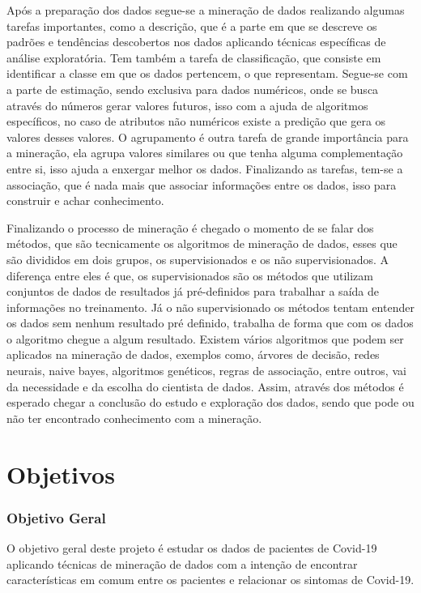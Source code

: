 \documentclass[tcc1]{uftex}
\begin{document}
Após a preparação dos dados segue-se a mineração de dados realizando algumas tarefas importantes, como a descrição, que é a parte em que se descreve os padrões e tendências descobertos nos dados aplicando técnicas específicas de análise exploratória. Tem também a tarefa de classificação, que consiste em identificar a classe em que os dados pertencem, o que representam. Segue-se com a parte de estimação, sendo exclusiva para dados numéricos, onde se busca através do números gerar valores futuros, isso com a ajuda de algoritmos específicos, no caso de atributos não numéricos existe a predição que gera os valores desses valores. O agrupamento é outra tarefa de grande importância para a mineração, ela agrupa valores similares ou que tenha alguma complementação entre si, isso ajuda a enxergar melhor os dados. Finalizando as tarefas, tem-se a associação, que é nada mais que associar informações entre os dados, isso para construir e achar conhecimento.\cite{camilo2009mineraccao} 

Finalizando o processo de mineração é chegado o momento de se falar dos métodos, que são tecnicamente os algoritmos de mineração de dados, esses que são divididos em dois grupos, os supervisionados e os não supervisionados. A diferença entre eles é que, os supervisionados são os métodos que utilizam conjuntos de dados de resultados já pré-definidos para trabalhar a saída de informações no treinamento. Já o não supervisionado os métodos tentam entender os dados sem nenhum resultado pré definido, trabalha de forma que com os dados o algoritmo chegue a algum resultado.\cite{camilo2009mineraccao}  Existem vários algoritmos que podem ser aplicados na mineração de dados, exemplos como, árvores de decisão, redes neurais, naive bayes, algoritmos genéticos, regras de associação, entre outros, vai da necessidade e da escolha do cientista de dados. Assim, através dos métodos é esperado chegar a conclusão do estudo e exploração dos dados, sendo que pode ou não ter encontrado conhecimento com a mineração.



\chapter{Objetivos}
\subsection*{Objetivo Geral}
O objetivo geral deste projeto é estudar os dados de pacientes de Covid-19 aplicando técnicas de mineração de dados com a intenção de encontrar características em comum entre os pacientes e relacionar os sintomas de Covid-19.
\end{document}
